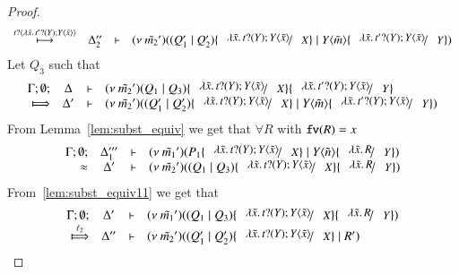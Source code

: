 \begin{proof}
\[\begin{array}{crll}
			\hby{\bactinp{t}{\abs{\tilde{x}}{\binp{t'}{Y} \appl{Y}{\tilde{x}}}}}
			& \Delta_2''& \proves& \newsp{\tilde{m_2}'}{(Q_1' \Par Q_2') \subst{\abs{\tilde{x}}{\binp{t}{Y} \appl{Y}{\tilde{x}}}}{X} \Par \appl{Y}{\tilde{m}} \subst{\abs{\tilde{x}}{\binp{t'}{Y} \appl{Y}{\tilde{x}}}}{Y}}
		\end{array}
	\]
%
%
	Let $Q_3$ such that
	\[
		\mhorel{\Gamma}{\Delta}{\newsp{\tilde{m_2}'}{Q_1 \Par Q_3} \subst{\abs{\tilde{x}}{\binp{t}{Y} \appl{Y}{\tilde{x}}}}{X} \subst{\abs{\tilde{x}}{\binp{t'}{Y} \appl{Y}{\tilde{x}}}}{Y}}
		{\Hby{}}
		{\Delta'}{}{\newsp{\tilde{m_2}'}{(Q_1' \Par Q_2') \subst{\abs{\tilde{x}}{\binp{t}{Y} \appl{Y}{\tilde{x}}}}{X} \Par \appl{Y}{\tilde{m}} \subst{\abs{\tilde{x}}{\binp{t'}{Y} \appl{Y}{\tilde{x}}}}{Y}}}
	\]
%
	\noi From Lemma~\ref{lem:subst_equiv} we get that $\forall R$ with $\mathtt{fv}(R) = x$
%
	\begin{eqnarray*}
		\mhorel{\Gamma}{\Delta_1'''}{\newsp{\tilde{m_1}'}{P_1 \subst{\abs{\tilde{x}}{\binp{t}{Y} \appl{Y}{\tilde{x}}}}{X} \Par \appl{Y}{\tilde{n}} \subst{\abs{\tilde{x}}{R}}{Y}}}
		{\wb}
		{\Delta'}{}{\newsp{\tilde{m_2}'}{(Q_1 \Par Q_3) \subst{\abs{\tilde{x}}{\binp{t}{Y} \appl{Y}{\tilde{x}}}}{X} \subst{\abs{\tilde{x}}{R}}{Y}}}
	\end{eqnarray*}
%
	\noi From~\ref{lem:subst_equiv11} we get that
\[
	\mhorel{\Gamma}{\Delta'}{\newsp{\tilde{m_1}'}{(Q_1 \Par Q_3) \subst{\abs{\tilde{x}}{\binp{t}{Y} \appl{Y}{\tilde{x}}}}{X} \subst{\abs{\tilde{x}}{R}}{Y}}}
	{\Hby{\ell_2}}
	{\Delta''}{}{\newsp{\tilde{m_2}'}{(Q_1' \Par Q_2') \subst{\abs{\tilde{x}}{\binp{t}{Y} \appl{Y}{\tilde{x}}}}{X} \Par R'}}%
\]
\end{proof}
